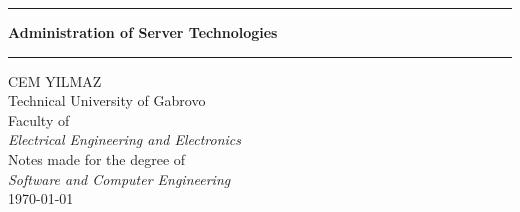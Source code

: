 \documentclass[a4paper, 12pt]{article}
\newcommand{\coloredrule}[2][tugblue]{%
  \textcolor{#1}{\rule{\linewidth}{#2}}%
}
\theoremstyle{plain}
\theoremstyle{definition}
\theoremstyle{remark}
\begin{document}
\begin{titlepage}
        \vspace*{0.8cm}
        \begin{center}
                \coloredrule{2pt}\par
                \vskip 0.6cm
                \textbf{\Huge Administration of Server Technologies}\par
                \vskip 0.3cm
                \coloredrule{2pt}\par

                \vskip 3cm

                

                \vspace{3cm} %
                \Large CEM YILMAZ \\
                \Large Technical University of Gabrovo \\
                \Large Faculty of \\
                \Large\textit{Electrical Engineering and Electronics}\\

                \vspace{2cm}
                \Large Notes made for the degree of\\
                \Large \textit{Software and Computer Engineering}\\
                \Large \today \\
                \vspace{0.5cm}

                \vfill  %
        \end{center}
\end{titlepage}

\tableofcontents
\newpage
\end{document}
